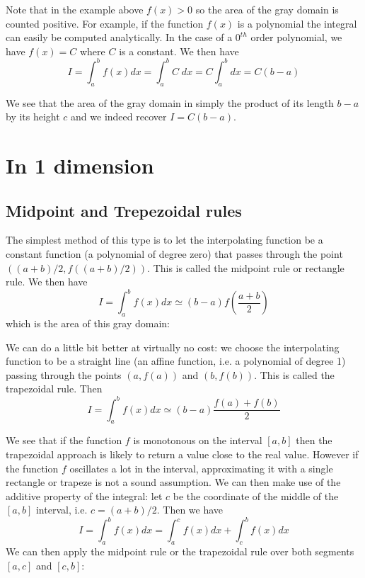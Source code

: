 

Note that in the example above $f(x)>0$ so the area of the gray domain is counted positive.
For example, if the function $f(x)$ is a polynomial the integral can easily be computed 
analytically. In the case of a $0^{th}$ order polynomial, we have $f(x)=C$ where $C$ is a 
constant. We then have 
\begin{equation}
I=\int_a^b f(x) dx = \int_a^b C \; dx  = C \int_a^b dx = C(b-a)
\end{equation}



We see that the area of the gray domain in simply the product of its length $b-a$ by its height $c$
and we indeed recover $I=C(b-a)$.

\section{In 1 dimension}

\subsection{Midpoint and Trepezoidal rules  \label{sec:quad1D}}

The simplest method of this type is to let the interpolating function be 
a constant function (a polynomial of degree zero) that passes through the point $((a+b)/2, f((a+b)/2))$.
This is called the midpoint rule  or rectangle rule. 
We then have 
\[
I=\int_a^b f(x)dx \simeq (b-a) f\left(\frac{a+b}{2}\right)
\]
which is the area of this gray domain:



We can do a little bit better at virtually no cost:
we choose the interpolating function to be a straight line 
(an affine function, i.e. a polynomial of degree 1)
passing through the points $(a, f(a))$ and $(b, f(b))$.
This is called the trapezoidal rule.  
Then 
\[
I=\int_a^b f(x)dx \simeq (b-a) \frac{f(a)+f(b)}{2}
\]



We see that if the function $f$ is monotonous on the interval $[a,b]$ then 
the trapezoidal approach is likely to return a value close to the real value. 
However if the function $f$ oscillates a lot in the interval, approximating it 
with a single rectangle or trapeze is not a sound assumption.
We can then make use of the additive property of the integral: let $c$ 
be the coordinate of the middle of the $[a,b]$ interval, i.e. $c=(a+b)/2$. 
Then we have 
\[
I=\int_a^b f(x)dx = \int_a^c f(x)dx + \int_c^b f(x)dx
\]
We can then apply the midpoint rule or the trapezoidal rule over both segments 
$[a,c]$ and $[c,b]$:

